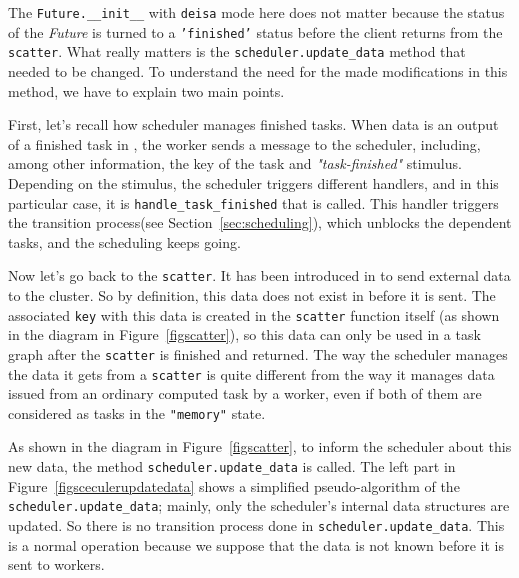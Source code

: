 The \texttt{Future.\_\_init\_\_} with \texttt{deisa} mode here does not matter because the status of the \textit{Future} is turned to a \texttt{'finished'} status before the client returns from the \texttt{scatter}.
What really matters is the \texttt{scheduler.update\_data} method that needed to be changed. To understand the need for the made modifications in this method, we have to explain two main points.

First, let's recall how \dask scheduler manages finished tasks. When data is an output of a finished task in \dask, the worker sends a message to the scheduler, including, among other information, the key of the task and \textit{"task-finished"} stimulus. Depending on the stimulus, the scheduler triggers different handlers, and in this particular case, it is \texttt{handle\_task\_finished} that is called. 
This handler triggers the transition process(see Section~\ref{sec:scheduling}), which unblocks the dependent tasks, and the scheduling keeps going.

Now let's go back to the \texttt{scatter}. It has been introduced in \dask to send external data to the cluster. So by definition, this data does not exist in \dask before it is sent. The associated \texttt{key} with this data is created in the \texttt{scatter} function itself (as shown in the diagram in Figure~\ref{figscatter}), so this data can only be used in a task graph after the \texttt{scatter} is finished and returned.
The way the scheduler manages the data it gets from a \texttt{scatter} is quite different from the way it manages data issued from an ordinary computed task by a worker, even if both of them are considered as tasks in the \texttt{"memory"} state.

As shown in the diagram in Figure~\ref{figscatter}, to inform the scheduler about this new data, the method \texttt{scheduler.update\_data} is called. The left part in Figure~\ref{figsceculerupdatedata} shows a simplified pseudo-algorithm of the \texttt{scheduler.update\_data}; mainly, only the scheduler's internal data structures are updated. So there is no transition process done in \texttt{scheduler.update\_data}. This is a normal operation because we suppose that the data is not known before it is sent to \dask workers. 

